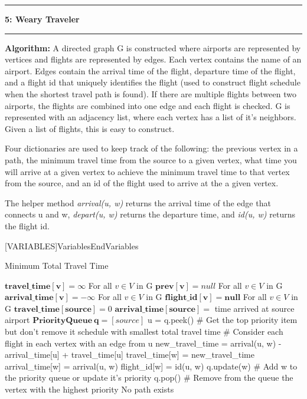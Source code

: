 \documentclass[11pt]{article}
\newcommand\question[2]{\vspace{.25in}\hrule\textbf{#1: #2}\vspace{.5em}\hrule\vspace{.10in}}
\newcommand\algorith{\vspace{.10in}\textbf{Algorithm: }}
\begin{document}
\question{5}{Weary Traveler}

\algorith A directed graph G is constructed where airports are represented by vertices and flights are represented by edges. Each vertex contains the name of an airport. Edges contain the arrival time of the flight, departure time of the flight, and a flight id that uniquely identifies the flight (used to construct flight schedule when the shortest travel path is found). If there are multiple flights between two airports, the flights are combined into one edge and each flight is checked. G is represented with an adjacency list, where each vertex has a list of it's neighbors. Given a list of flights, this is easy to construct.

	Four dictionaries are used to keep track of the following: the previous vertex in a path, the minimum travel time from the source to a given vertex, what time you will arrive at a given vertex to achieve the minimum travel time to that vertex from the source, and an id of the flight used to arrive at the a given vertex.
	
	The helper method \textit{arrival(u, w)} returns the arrival time of the edge that connects u and w, \textit{depart(u, w)} returns the departure time, and \textit{id(u, w)} returns the flight id.
	
	[VARIABLES]{Variables}{EndVariables}
   {\algorithmicvariables}
   {\algorithmicend\ \algorithmicvariables}

\begin{algorithm}[H]
\caption{Minimum Total Travel Time}
\label{CHalgorithm}
\begin{algorithmic}[1]
\Variables
\State $\mathbf{travel\_time[v]} = \infty$ For all $v \in V$ in G
\State $\mathbf{prev[v]} = null$ For all $v \in V$ in G
\State $\mathbf{arrival\_time[v]} = -\infty$ For all $v \in V$ in G
\State $\mathbf{flight\_id[v] = null}$ For all $v \in V$ in G
\State
\State $\mathbf{travel\_time[source]} = 0$
\State $\mathbf{arrival\_time[source]} = $ time arrived at source airport
\State $\mathbf{PriorityQueue\ q} = [source]$
\EndVariables
\State
{}
\State u = q.peek()  \# Get the top priority item but don't remove it
\State \Return schedule with smallest total travel time
\EndIf
{} \# Consider each flight in each vertex with an edge from u
\State new\_travel\_time = arrival(u, w) - arrival\_time[u] + travel\_time[u]
\State travel\_time[w] = new\_travel\_time
\State arrival\_time[w] = arrival(u, w)
\State flight\_id[w] = id(u, w)
\State 
\State q.update(w) \# Add w to the priority queue or update it's priority
\EndIf
\EndFor
\EndFor
\State q.pop() \# Remove from the queue the vertex with the highest priority
\EndWhile
\State \Return No path exists
\EndProcedure
\end{algorithmic}
\end{algorithm}
\end{document}
